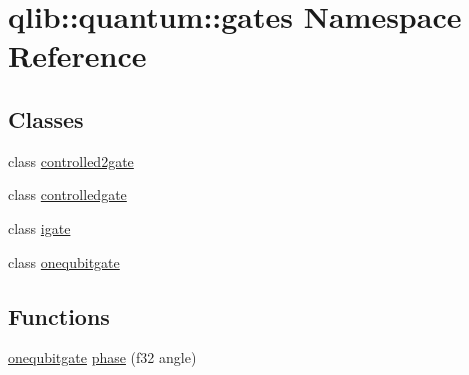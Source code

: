 \hypertarget{namespaceqlib_1_1quantum_1_1gates}{}\section{qlib\+:\+:quantum\+:\+:gates Namespace Reference}
\label{namespaceqlib_1_1quantum_1_1gates}
\subsection*{Classes}
\begin{DoxyCompactItemize}
\item 
class \hyperlink{classqlib_1_1quantum_1_1gates_1_1controlled2gate}{controlled2gate}
\item 
class \hyperlink{classqlib_1_1quantum_1_1gates_1_1controlledgate}{controlledgate}
\item 
class \hyperlink{classqlib_1_1quantum_1_1gates_1_1igate}{igate}
\item 
class \hyperlink{classqlib_1_1quantum_1_1gates_1_1onequbitgate}{onequbitgate}
\end{DoxyCompactItemize}
\subsection*{Functions}
\begin{DoxyCompactItemize}
\item 
\hyperlink{classqlib_1_1quantum_1_1gates_1_1onequbitgate}{onequbitgate} \hyperlink{namespaceqlib_1_1quantum_1_1gates_a9404266e9a103216de1b3c5ae2b8c8e5}{phase} (f32 angle)
\end{DoxyCompactItemize}
